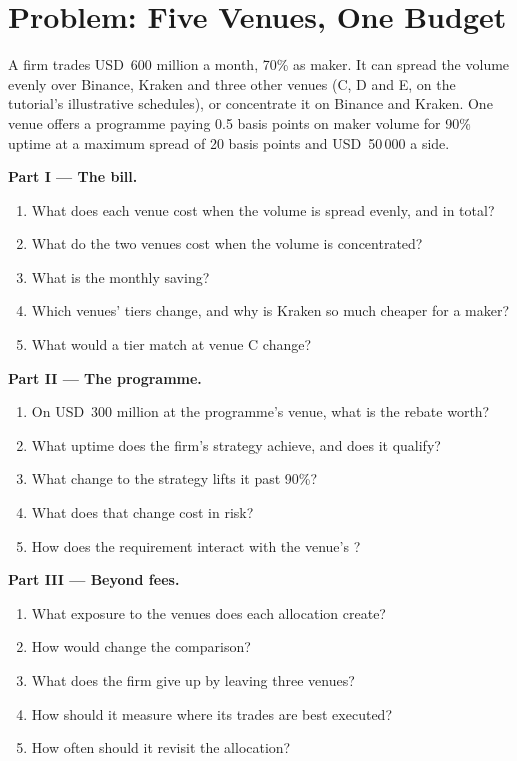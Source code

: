 \section{Problem: Five Venues, One Budget}

\begin{problem}\label{pb:m3:getting-access-crypto-venues:1}
A firm trades USD~600 million a month, 70\% as maker. It can spread the volume evenly over Binance, Kraken and three other venues (C, D and E, on the
tutorial's illustrative schedules), or concentrate it on Binance and Kraken. One venue offers a programme paying 0.5 basis points on maker volume for
90\% uptime at a maximum spread of 20 basis points and USD~50\,000 a side.

\medskip\noindent\textbf{Part I --- The bill.}
\begin{enumerate}
\item What does each venue cost when the volume is spread evenly, and in total?
\item What do the two venues cost when the volume is concentrated?
\item What is the monthly saving?
\item Which venues' tiers change, and why is Kraken so much cheaper for a maker?
\item What would a tier match at venue C change?
\end{enumerate}

\medskip\noindent\textbf{Part II --- The programme.}
\begin{enumerate}[resume]
\item On USD~300 million at the programme's venue, what is the rebate worth?
\item What uptime does the firm's strategy achieve, and does it qualify?
\item What change to the strategy lifts it past 90\%?
\item What does that change cost in risk?
\item How does the requirement interact with the venue's ?
\end{enumerate}

\medskip\noindent\textbf{Part III --- Beyond fees.}
\begin{enumerate}[resume]
\item What exposure to the venues does each allocation create?
\item How would  change the comparison?
\item What does the firm give up by leaving three venues?
\item How should it measure where its trades are best executed?
\item How often should it revisit the allocation?
\end{enumerate}


\end{problem}
